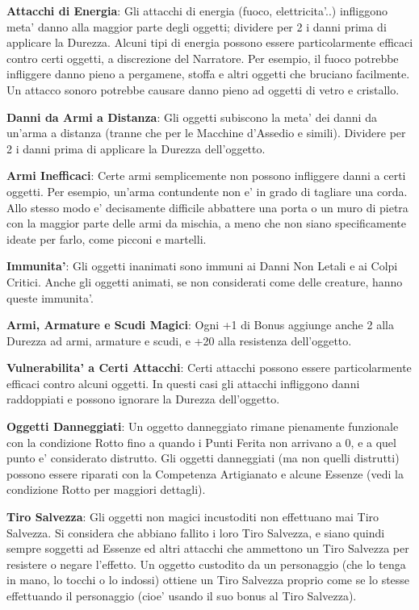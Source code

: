 \documentclass[a4paper,11pt,twoside,openany]{dndbook}
\begin{document}
{\bigskip

\textbf{Attacchi di Energia}: Gli attacchi di energia (fuoco, elettricita'..) infliggono meta' danno alla maggior parte degli oggetti; dividere per 2 i danni prima di applicare la Durezza. Alcuni tipi di energia possono essere particolarmente efficaci contro certi oggetti, a discrezione del Narratore. Per esempio, il fuoco potrebbe infliggere danno pieno a pergamene, stoffa e altri oggetti che bruciano facilmente. Un attacco sonoro potrebbe causare danno pieno ad oggetti di vetro e cristallo.

\textbf{Danni da Armi a Distanza}: Gli oggetti subiscono la meta' dei danni da un'arma a distanza (tranne che per le Macchine d'Assedio e simili). Dividere per 2 i danni prima di applicare la Durezza dell'oggetto.

\textbf{Armi Inefficaci}: Certe armi semplicemente non possono infliggere danni a certi oggetti. Per esempio, un'arma contundente non e' in grado di tagliare una corda. Allo stesso modo e' decisamente difficile abbattere una porta o un muro di pietra con la maggior parte delle armi da mischia, a meno che non siano specificamente ideate per farlo, come picconi e martelli.

\textbf{Immunita'}: Gli oggetti inanimati sono immuni ai Danni Non Letali e ai Colpi Critici. Anche gli oggetti animati, se non considerati come delle creature, hanno queste immunita'.

\textbf{Armi, Armature e Scudi Magici}: Ogni +1 di Bonus aggiunge anche 2 alla Durezza ad armi, armature e scudi, e +20 alla resistenza dell'oggetto.

\textbf{Vulnerabilita' a Certi Attacchi}: Certi attacchi possono essere particolarmente efficaci contro alcuni oggetti. In questi casi gli attacchi infliggono danni raddoppiati e possono ignorare la Durezza dell'oggetto.

\textbf{Oggetti Danneggiati}: Un oggetto danneggiato rimane pienamente funzionale con la condizione Rotto fino a quando i Punti Ferita non arrivano a 0, e a quel punto e' considerato distrutto. Gli oggetti danneggiati (ma non quelli distrutti) possono essere riparati con la Competenza Artigianato e alcune Essenze (vedi la condizione Rotto per maggiori dettagli).

\textbf{Tiro Salvezza}: Gli oggetti non magici incustoditi non effettuano
mai Tiro Salvezza. Si considera che abbiano fallito i loro Tiro Salvezza,
e siano quindi sempre soggetti ad Essenze ed altri attacchi che ammettono
un Tiro Salvezza per resistere o negare l'effetto. Un oggetto custodito
da un personaggio (che lo tenga in mano, lo tocchi o lo indossi) ottiene
un Tiro Salvezza proprio come se lo stesse effettuando il personaggio
(cioe' usando il suo bonus al Tiro Salvezza).

}
\end{document}
